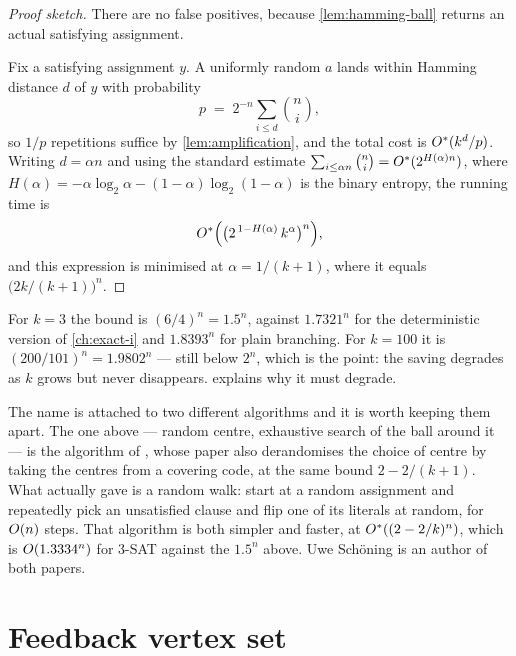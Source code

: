 \begin{proof}[Proof sketch]
There are no false positives, because \cref{lem:hamming-ball} returns an actual
satisfying assignment.

Fix a satisfying assignment $y$. A uniformly random $a$ lands within Hamming
distance $d$ of $y$ with probability
\[ p \;=\; 2^{-n}\sum_{i \le d}\binom{n}{i}, \]
so $1/p$ repetitions suffice by \cref{lem:amplification}, and the total cost is
$O^{*}(k^{d}/p)$. Writing $d = \alpha n$ and using the standard estimate
$\sum_{i\le \alpha n}\binom{n}{i} = O^{*}(2^{H(\alpha)n})$, where
$H(\alpha) = -\alpha\log_2\alpha - (1-\alpha)\log_2(1-\alpha)$ is the binary
entropy, the running time is
\[ O^{*}\Bigl( \bigl( 2^{\,1 - H(\alpha)} \, k^{\alpha} \bigr)^{n} \Bigr), \]
and this expression is minimised at $\alpha = 1/(k+1)$, where it equals
$\bigl(2k/(k+1)\bigr)^n$.
\end{proof}

\begin{example}\label{ex:schoening-numbers}
For $k = 3$ the bound is $(6/4)^n = 1.5^n$, against $1.7321^n$ for the
deterministic version of \cref{ch:exact-i} and $1.8393^n$ for plain branching.
For $k = 100$ it is $(200/101)^n = 1.9802^n$ --- still below $2^n$, which is
the point: the saving degrades as $k$ grows but never disappears.
 explains why it must degrade.
\end{example}

\begin{remark}\label{rem:schoening-attribution}
The name is attached to two different algorithms and it is worth keeping them
apart. The one above --- random centre, exhaustive search of the ball around it
--- is the algorithm of \citet{DantsinEtAl2002}, whose paper also derandomises
the choice of centre by taking the centres from a covering code, at the same
bound $2 - 2/(k+1)$. What \citet{Schoening1999} actually gave is a random walk:
start at a random assignment and repeatedly pick an unsatisfied clause and flip
one of its literals at random, for $O\!\left(n\right)$ steps. That algorithm is both
simpler and faster, at $O^{*}((2 - 2/k)^n)$, which is $O\!\left(1.3334^n\right)$ for
$3$-SAT against the $1.5^n$ above. Uwe Sch\"oning is an author of both papers.
\end{remark}

\section{Feedback vertex set}
\label{sec:fvs}


